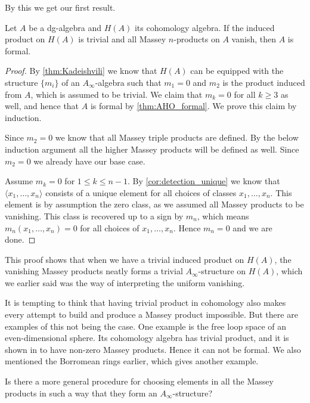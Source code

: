 By this we get our first result.

\begin{theorem}
    \label{thm:1}
    Let $A$ be a dg-algebra and $H(A)$ its cohomology algebra. If the induced product on 
    $H(A)$ is trivial and all Massey $n$-products on $A$ vanish, then $A$ is formal.        
\end{theorem}

\begin{proof}
    By \cref{thm:Kadeishvili} we know that $H(A)$ can be equipped with the structure 
    $\{m_i\}$ of an $A_\infty$-algebra such that $m_1=0$ and $m_2$ is the product induced 
    from $A$, which is assumed to be trivial. We claim that $m_k = 0$ for all $k\geq 3$ 
    as well, and hence that $A$ is formal by \cref{thm:AHO_formal}. We prove this 
    claim by induction. 
    
    Since $m_2=0$ we know that all Massey triple products are defined. By the below 
    induction argument all the higher Massey products will be defined as well. Since 
    $m_2=0$ we already have our base case.
    
    Assume $m_k = 0$ for $1\leq k\leq n-1$. By \cref{cor:detection_unique} we know 
    that $\langle x_1, \ldots, x_n \rangle$ consists of a unique element for all choices of 
    classes $x_1, \ldots, x_n$. This element is by assumption the zero class, as we assumed 
    all Massey products to be vanishing. This class is recovered up to a sign by $m_n$, 
    which means $m_n(x_1,\ldots, x_n)=0$ for all choices of $x_1, \ldots, x_n$. Hence 
    $m_n=0$ and we are done. 
\end{proof}

This proof shows that when we have a trivial induced product on $H(A)$, the vanishing 
Massey products neatly forms a trivial $A_\infty$-structure on $H(A)$, which we earlier 
said was the way of interpreting the uniform vanishing.

It is tempting to think that having trivial product in cohomology also makes every attempt 
to build and produce a Massey product impossible. But there are examples of this not being 
the case. One example is the free loop space of an even-dimensional sphere. Its cohomology 
algebra has trivial product, and it is shown in \cite{nonformal_loop} to have non-zero 
Massey products. Hence it can not be formal. We also mentioned the Borromean rings earlier, 
which gives another example. 

\begin{question}
Is there a more general procedure for choosing elements in all the Massey 
products in such a way that they form an $A_\infty$-structure?
\end{question}